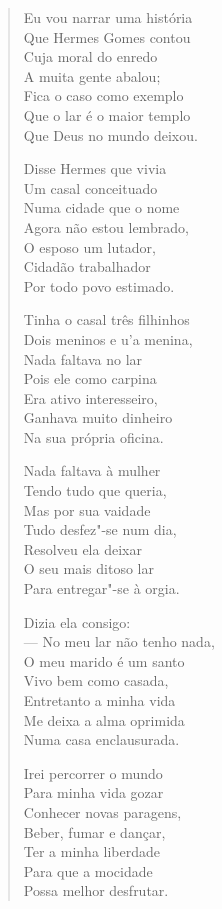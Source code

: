 \begin{verse}
Eu vou narrar uma história \\
Que Hermes Gomes contou \\
Cuja moral do enredo \\
A muita gente abalou; \\
Fica o caso como exemplo \\
Que o lar é o maior templo \\
Que Deus no mundo deixou. 

Disse Hermes que vivia \\
Um casal conceituado \\
Numa cidade que o nome \\
Agora não estou lembrado, \\
O esposo um lutador, \\
Cidadão trabalhador \\
Por todo povo estimado. 

Tinha o casal três filhinhos \\
Dois meninos e u'a menina, \\
Nada faltava no lar \\
Pois ele como carpina \\
Era ativo interesseiro, \\
Ganhava muito dinheiro \\
Na sua própria oficina.


Nada faltava à mulher \\
Tendo tudo que queria, \\
Mas por sua vaidade \\
Tudo desfez"-se num dia, \\
Resolveu ela deixar \\
O seu mais ditoso lar \\
Para entregar"-se à orgia. 

Dizia ela consigo: \\
---  No meu lar não tenho nada, \\
O meu marido é um santo \\
Vivo bem como casada, \\
Entretanto a minha vida \\
Me deixa a alma oprimida \\
Numa casa enclausurada. 

Irei percorrer o mundo \\
Para minha vida gozar \\
Conhecer novas paragens, \\
Beber, fumar e dançar, \\
Ter a minha liberdade \\
Para que a mocidade \\
Possa melhor desfrutar. 


\end{verse}
